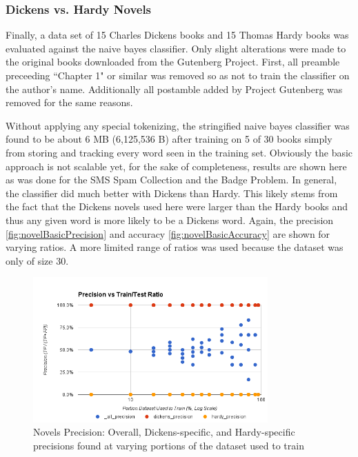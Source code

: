 \subsubsection{Dickens vs. Hardy Novels}
\label{subsection:novelsBasic}
Finally, a data set of 15 Charles Dickens books \cite{gutenberg:dickens} and 15 Thomas Hardy books \cite{gutenberg:hardy}
was evaluated against the naive bayes classifier. Only slight alterations were made to the original books downloaded
from the Gutenberg Project. First, all preamble preceeding ``Chapter 1" or similar was removed so as not to train the
classifier on the author's name. Additionally all postamble added by Project Gutenberg was removed for the same reasons.

Without applying any special tokenizing, the stringified naive bayes classifier was found to be about 6 MB (6,125,536 B)
after training on 5 of 30 books simply from storing and tracking every word seen in the training set. Obviously the
basic approach is not scalable yet, for the sake of completeness, results are shown here as was done for the SMS Spam
Collection and the Badge Problem. In general, the classifier did much better with Dickens than Hardy. This likely
stems from the fact that the Dickens novels used here were larger than the Hardy books and thus any given word is more
likely to be a Dickens word. Again, the precision \ref{fig:novelBasicPrecision} and accuracy \ref{fig:novelBasicAccuracy}
are shown for varying ratios. A more limited range of ratios was used because the dataset was only of size 30.

\begin{figure}[ht!]
    \centering
    \includegraphics[width=90mm]{img/novels_basic-precision.png}
    \caption{Novels Precision: Overall, Dickens-specific, and Hardy-specific precisions found at varying portions of the dataset used to train}
    \label{fig:spamBasicPrecision}
\end{figure}

